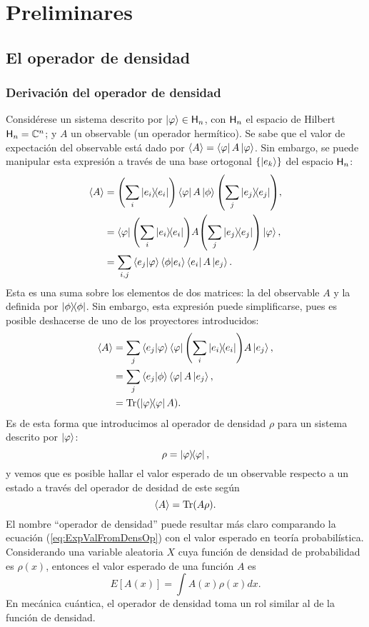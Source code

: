 \chapter{Preliminares}
\section{El operador de densidad}
\subsection{Derivación del operador de densidad}
Considérese un sistema descrito por $\ket{\varphi}\in{\sf H}_{n}$, con ${\sf H}_{n}$ el espacio de Hilbert 
${\sf H}_{n}=\mathbb{C}^{n}$; y $A$ un observable (un operador hermítico). Se sabe que el valor de expectación del observable está dado por $\expval{A}=\bra{\varphi}A\ket{\varphi}$. Sin embargo, se puede manipular esta expresión a través de una base ortogonal $\{\ket{e_{k}}\}$ del espacio ${\sf H}_{n}$:
\begin{align*}
\expval{A}&=\qty(\sum_{i}\dyad{e_{i}})\bra{\varphi}A\ket{\phi}\qty(\sum_{j}\dyad{e_{j}}),\\
&=\bra{\varphi}\qty(\sum_{i}\dyad{e_{i}})A\qty(\sum_{j}\dyad{e_{j}})\ket{\varphi},\\
&=\sum_{i,j}\bra{e_{j}}\ket{\varphi}\bra{\phi}\ket{e_{i}}\bra{e_{i}}A\ket{e_{j}}.\\
\end{align*}
Esta es una suma sobre los elementos de dos matrices: la del observable $A$ y la definida por $\dyad{\phi}$. 
Sin embargo, esta expresión puede simplificarse, pues es posible deshacerse de uno de los proyectores introducidos:
\begin{align*}
\expval{A}&=\sum_{j}\bra{e_{j}}\ket{\varphi}\bra{\varphi}\qty(\sum_{i}\dyad{e_{i}})A\ket{e_{j}},\\
&=\sum_{j}\bra{e_{j}}\ket{\phi}\bra{\varphi}A\ket{e_{j}},\\
&=\Tr(\dyad{\varphi}A).\\
\end{align*}
Es de esta forma que introducimos al operador de densidad $\rho$ para un sistema descrito por $\ket{\varphi}$:
\begin{equation}\label{eq:DensOpPure}
\rho=\dyad{\varphi},
\end{equation} 
y vemos que es posible hallar el valor esperado de un observable respecto a un estado a través del operador 
de desidad de este según
\begin{equation}\label{eq:ExpValFromDensOp}
\expval{A}=\Tr(A\rho).
\end{equation}
El nombre ``operador de densidad'' puede resultar más claro comparando la ecuación (\ref{eq:ExpValFromDensOp}) con el valor esperado en teoría probabilística. Considerando una variable aleatoria $X$ cuya función de densidad de probabilidad es $\rho(x)$, entonces el valor esperado de una función $A$ es
\begin{equation*}
E[A(x)]=\int A(x) \rho(x) dx.
\end{equation*}
En mecánica cuántica, el operador de densidad toma un rol similar al de la función de densidad.
